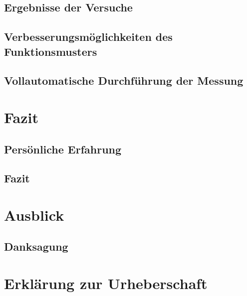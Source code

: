 \documentclass[a4paper,12pt]{article}
\begin{document}
\subsection{Ergebnisse der Versuche}


%

\subsection{Verbesserungsmöglichkeiten des Funktionsmusters}

\newpage
\subsection{Vollautomatische Durchführung der Messung}


\newpage
\section{Fazit}
%

\subsection{Persönliche Erfahrung}


\subsection{Fazit}


\section{Ausblick}

\newpage
\subsection*{Danksagung}


\newpage
%


\newpage
\section*{Erklärung zur Urheberschaft}

\end{document}
